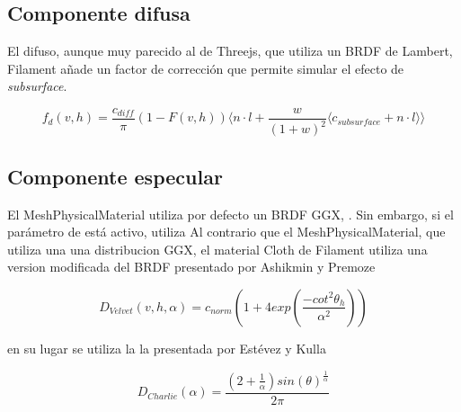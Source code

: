   \subsection{Componente difusa}

  El difuso, aunque muy parecido al de Threejs, que utiliza un BRDF de Lambert,
  Filament a\~nade un factor de correcci\'on que permite simular el efecto de \textit{subsurface}.

  \begin{equation}
  f_d(v, h) = \frac{c_{diff}}{\pi}(1 - F(v, h))
  \Bigg\langle
  n\cdot{l} + \frac{w}{(1+ w)^2}\langle c_{subsurface} + n \cdot{l} \rangle
  \Bigg\rangle
  \end{equation}
  \singlespacing

  \subsection{Componente especular}

  El MeshPhysicalMaterial utiliza por defecto un BRDF GGX, \autocite{ggx}. Sin embargo, si el par\'ametro de 
  est\'a activo, utiliza 
  Al contrario que el MeshPhysicalMaterial, que utiliza una una distribucion GGX, el material
  Cloth de Filament utiliza una  version modificada del BRDF presentado por Ashikmin y Premoze
  \autocite{velvet}

  \begin{equation}
  D_{Velvet}(v, h, \alpha) = c_{norm} (
    1 + 4exp \left(\frac{-cot^2\theta_h}{\alpha^2}\right)
  )
  \end{equation}
  \singlespacing

  en su lugar se utiliza la la presentada por Est\'evez y Kulla \autocite{sheen}

  \begin{equation}
    D_{Charlie}(\alpha) = \frac
      {(2 + \frac{1}{\alpha})sin(\theta)^\frac{1}{\alpha}}
      {2\pi}
  \end{equation}
  \singlespacing

